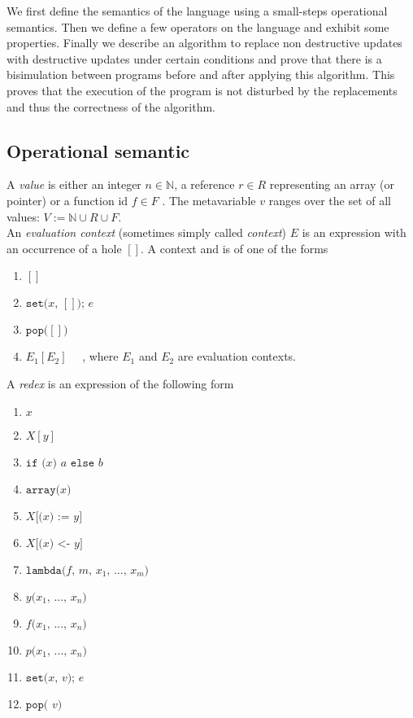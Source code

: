 \documentclass[12pt,a4paper]{article}
\newcommand{\cl}[1]{\texttt{#1}}
\newcommand{\N}{\mathbb{N}}
\newcommand{\econt}[1]{[#1]}
\begin{document}
We first define the semantics of the language using a small-steps operational semantics. Then we define a few operators on the language and exhibit some properties.
Finally we describe an algorithm to replace non destructive updates with destructive updates under certain conditions and prove that there is a bisimulation between programs before and after applying this algorithm. This proves that the execution of the program is not disturbed by the replacements and thus the correctness of the algorithm.



\subsection{Operational semantic}

A \emph{value} is either an integer $n \in \N$, a reference $r \in R$ representing an array (or pointer) or a function id $f \in F$ . The metavariable $v$ ranges over the set of all values: $V := \N \cup R \cup F$.\\

An \emph{evaluation context} (sometimes simply called \emph{context}) $E$ is an expression with an occurrence of a hole $\econt{}$. A context  and is of one of the forms
\begin{enumerate}
\itemsep-0.2em
\item $\econt{}$
\item $\cl{set(} x \cl{, } \econt{} \cl{); } e$
\item $\cl{pop(} \econt{} \cl{)}$
\item $E_1\econt{E_2}$ \ \ , where $E_1$ and $E_2$ are evaluation contexts.
\end{enumerate}

A \emph{redex} is an expression of the following form
\begin{enumerate}
\itemsep-0.2em
\item $x$
\item $X[y]$
\item $\cl{if (} x \cl{) } a \cl{ else } b $
\item $\cl{array(} x \cl{)}$
\item $X\cl{[(} x \cl{) := } y \cl{]}$
\item $X\cl{[(} x \cl{) <- } y \cl{]}$
\item $\cl{lambda(}  f \cl{, } m \cl{, } x_1 \cl{, } ... \cl{, } x_m \cl{)}$
\item $y\cl{(} x_1 \cl{, } ... \cl{, } x_n \cl{)}$
\item $f\cl{(} x_1 \cl{, } ... \cl{, } x_n \cl{)}$
\item $p\cl{(} x_1 \cl{, } ... \cl{, } x_n \cl{)}$
\item $\cl{set(} x \cl{, } v \cl{); } e$
\item $\cl{pop( } v \cl{)}$
\end{enumerate}
\end{document}
